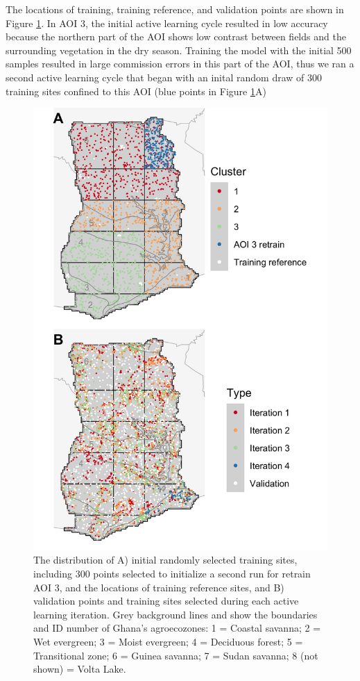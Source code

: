 \documentclass[
  11pt,
  a4paper]{article}
\begin{document}
The locations of training, training reference, and validation points are
shown in Figure \ref{fig:trainval}. In AOI 3, the initial active
learning cycle resulted in low accuracy because the northern part of the
AOI shows low contrast between fields and the surrounding vegetation in
the dry season. Training the model with the initial 500 samples resulted
in large commission errors in this part of the AOI, thus we ran a second
active learning cycle that began with an inital random draw of 300
training sites confined to this AOI (blue points in Figure
\ref{fig:trainval}A)

\begin{figure}[!ht]

{\centering \includegraphics[width=0.7\linewidth,]{figures/si_training_validation_pts} 

}

\caption{The distribution of A) initial randomly selected training sites, including 300 points selected to initialize a second run for retrain AOI 3, and the locations of training reference sites, and B) validation points and training sites selected during each active learning iteration. Grey background lines and show the boundaries and ID number of Ghana's agroecozones: 1 = Coastal savanna; 2 = Wet evergreen; 3 = Moist evergreen; 4 = Deciduous forest; 5 = Transitional zone; 6 = Guinea savanna; 7 = Sudan savanna; 8 (not shown) = Volta Lake.}\label{fig:trainval}
\end{figure}
\end{document}
